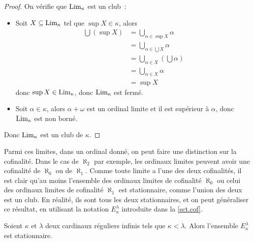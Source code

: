 \begin{proof}
  On vérifie que $\operatorname{Lim}_\kappa$ est un club~:
  \begin{itemize}
  \item Soit $X\subseteq \operatorname{Lim}_\kappa$ tel que $\sup X \in \kappa$, alors
    \begin{align*}
      \bigcup (\sup X) &= \bigcup_{\alpha \in \sup X} \alpha \\
      &= \bigcup_{\alpha \in \bigcup X} \alpha \\
      &= \bigcup_{\alpha \in X} \left(\bigcup \alpha\right)\\
      &= \bigcup_{\alpha \in X} \alpha\\
      &= \sup X
    \end{align*}
    donc $\sup X \in \operatorname{Lim}_\kappa$, donc $\operatorname{Lim}_\kappa$ est fermé.
  \item Soit $\alpha \in \kappa$, alors $\alpha + \omega$ est un ordinal limite
    et il est supérieur à $\alpha$, donc $\operatorname{Lim}_\kappa$ est non borné.
  \end{itemize}
  Donc $\operatorname{Lim}_\kappa$ est un club de $\kappa$.
\end{proof}

Parmi ces limites, dans un ordinal donné, on peut faire une distinction sur la
cofinalité. Dans le cas de $\aleph_2$ par exemple, les ordinaux limites peuvent
avoir une cofinalité de $\aleph_0$ ou de $\aleph_1$. Comme toute limite a l'une
des deux cofinalités, il est clair qu'au moins l'ensemble des ordinaux limites
de cofinalité $\aleph_0$ ou celui des ordinaux limites de cofinalité $\aleph_1$
est stationnaire, comme l'union des deux est un club. En réalité, ils sont
tous les deux stationnaires, et on peut généraliser ce résultat, en utilisant
la notation $E_\kappa^\lambda$ introduite dans la \cref{sct.cof}.

\begin{proposition}
  Soient $\kappa$ et $\lambda$ deux cardinaux réguliers infinis tels que
  $\kappa < \lambda$. Alors l'ensemble $E_\kappa^\lambda$ est stationnaire.
\end{proposition}

